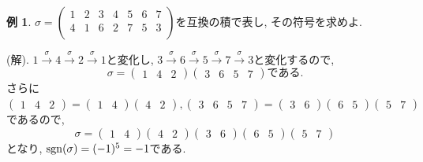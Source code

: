 \documentclass[dvipdfmx,a4paper,11pt]{article}
\newcommand{\sgn}{{\rm sgn}}
\theoremstyle{definition}
\newtheorem{exa}[thm]{例}
\begin{document}
 \begin{exa}
 $
 \sigma 
  =
 \begin{pmatrix}
 1& 2  &3 & 4 & 5 & 6 & 7\\
 4& 1  &6  &2 &7 & 5 & 3\\
 \end{pmatrix} 
 $を互換の積で表し, その符号を求めよ.
 
 (解). 
 $1 \overset{\sigma}{\rightarrow} 4 \overset{\sigma}{\rightarrow}2 \overset{\sigma}{\rightarrow}1 $と変化し,  
  $3 \overset{\sigma}{\rightarrow} 6\overset{\sigma}{\rightarrow}5 \overset{\sigma}{\rightarrow}7 \overset{\sigma}{\rightarrow}3$と変化するので, 
  $$
  \sigma = 
   \begin{pmatrix}
 1& 4 &2 
 \end{pmatrix} 
    \begin{pmatrix}
 3& 6 &5 &7
 \end{pmatrix} 
 \text{である.}
  $$
  さらに
  $   \begin{pmatrix}
 1& 4 &2 
 \end{pmatrix} 
 = 
 \begin{pmatrix}
 1& 4  
 \end{pmatrix} 
 \begin{pmatrix}
 4 &2 
 \end{pmatrix},
\begin{pmatrix}
 3& 6 &5 &7
 \end{pmatrix} 
 =
 \begin{pmatrix}
 3& 6  
 \end{pmatrix} 
  \begin{pmatrix}
 6& 5  
 \end{pmatrix} 
  \begin{pmatrix}
 5& 7  
 \end{pmatrix} 
 $
 であるので, 
 $$
\sigma= 
\begin{pmatrix}
 1& 4  
 \end{pmatrix} 
 \begin{pmatrix}
 4 &2 
 \end{pmatrix}
 \begin{pmatrix}
 3& 6  
 \end{pmatrix} 
  \begin{pmatrix}
 6& 5  
 \end{pmatrix} 
  \begin{pmatrix}
 5& 7  
 \end{pmatrix} 
 $$
 となり, $\sgn(\sigma)= (-1)^{5}=-1$である.
 
 \end{exa}
\end{document}
